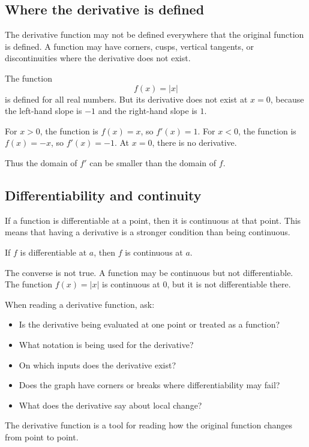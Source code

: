 \subsection*{Where the derivative is defined}

The derivative function may not be defined everywhere that the original function is defined. A function may have corners, cusps, vertical tangents, or discontinuities where the derivative does not exist.

\begin{examplebox}
The function
\[
f(x)=|x|
\]
is defined for all real numbers. But its derivative does not exist at \(x=0\), because the left-hand slope is \(-1\) and the right-hand slope is \(1\).

For \(x>0\), the function is \(f(x)=x\), so \(f'(x)=1\). For \(x<0\), the function is \(f(x)=-x\), so \(f'(x)=-1\). At \(x=0\), there is no derivative.
\end{examplebox}

Thus the domain of \(f'\) can be smaller than the domain of \(f\).

\subsection*{Differentiability and continuity}

If a function is differentiable at a point, then it is continuous at that point. This means that having a derivative is a stronger condition than being continuous.

\begin{theorembox}
If \(f\) is differentiable at \(a\), then \(f\) is continuous at \(a\).
\end{theorembox}

The converse is not true. A function may be continuous but not differentiable. The function \(f(x)=|x|\) is continuous at \(0\), but it is not differentiable there.

\begin{summarybox}
When reading a derivative function, ask:
\begin{itemize}
\item Is the derivative being evaluated at one point or treated as a function?
\item What notation is being used for the derivative?
\item On which inputs does the derivative exist?
\item Does the graph have corners or breaks where differentiability may fail?
\item What does the derivative say about local change?
\end{itemize}
\end{summarybox}

The derivative function is a tool for reading how the original function changes from point to point.